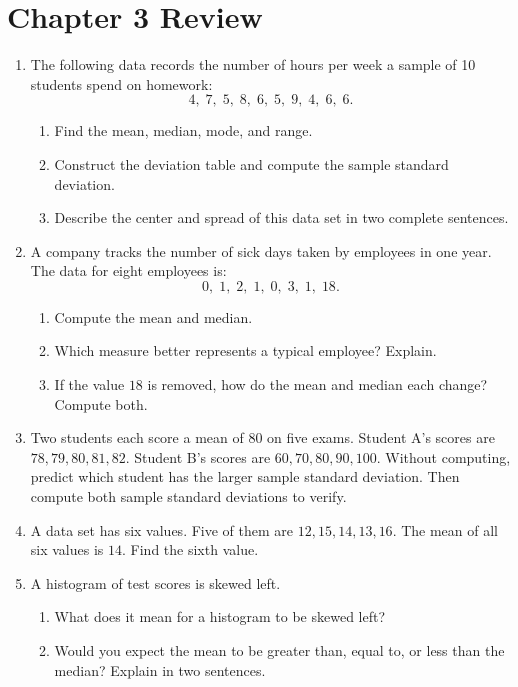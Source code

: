 \section*{Chapter 3 Review}
\begin{enumerate}[label=R\arabic*.,leftmargin=2.5em,itemsep=10pt]

  \item The following data records the number of hours per
    week a sample of 10 students spend on homework:
    \[ 4,\; 7,\; 5,\; 8,\; 6,\; 5,\; 9,\; 4,\; 6,\; 6. \]
    \begin{enumerate}[label=(\alph*), itemsep=4pt]
      \item Find the mean, median, mode, and range.
      \item Construct the deviation table and compute
        the sample standard deviation.
      \item Describe the center and spread of this data
        set in two complete sentences.
    \end{enumerate}

  \item A company tracks the number of sick days taken
    by employees in one year.
    The data for eight employees is:
    \[ 0,\; 1,\; 2,\; 1,\; 0,\; 3,\; 1,\; 18. \]
    \begin{enumerate}[label=(\alph*), itemsep=4pt]
      \item Compute the mean and median.
      \item Which measure better represents a typical
        employee? Explain.
      \item If the value $18$ is removed, how do the mean
        and median each change? Compute both.
    \end{enumerate}

  \item Two students each score a mean of $80$ on five
    exams. Student A's scores are
    $78, 79, 80, 81, 82$.
    Student B's scores are
    $60, 70, 80, 90, 100$.
    Without computing, predict which student has the
    larger sample standard deviation.
    Then compute both sample standard deviations to verify.

  \item A data set has six values.
    Five of them are $12, 15, 14, 13, 16$.
    The mean of all six values is $14$.
    Find the sixth value.

  \item A histogram of test scores is skewed left.
    \begin{enumerate}[label=(\alph*), itemsep=4pt]
      \item What does it mean for a histogram to be
        skewed left?
      \item Would you expect the mean to be greater than,
        equal to, or less than the median?
        Explain in two sentences.
    \end{enumerate}


\end{enumerate}
